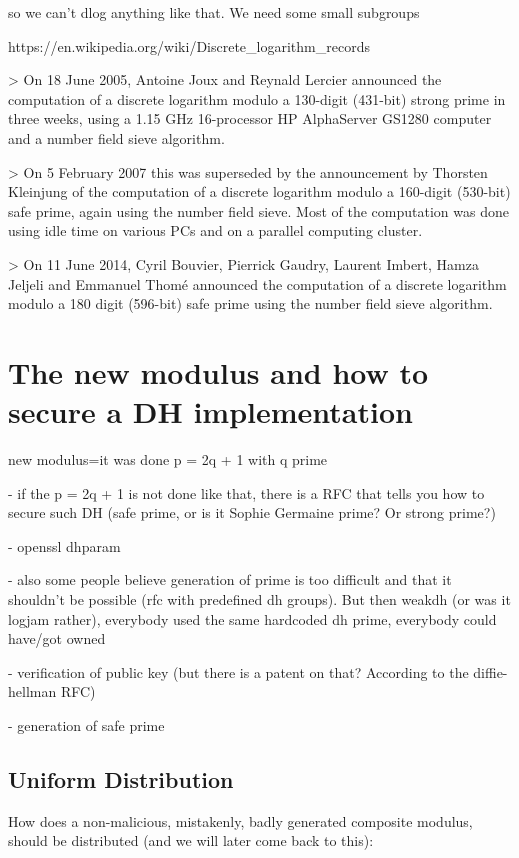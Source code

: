 \documentclass[a4paper,11pt]{article}
\begin{document}
so we can't dlog anything like that. We need some small subgroups

https://en.wikipedia.org/wiki/Discrete_logarithm_records

> On 18 June 2005, Antoine Joux and Reynald Lercier announced the computation of a discrete logarithm modulo a 130-digit (431-bit) strong prime in three weeks, using a 1.15 GHz 16-processor HP AlphaServer GS1280 computer and a number field sieve algorithm.

> On 5 February 2007 this was superseded by the announcement by Thorsten Kleinjung of the computation of a discrete logarithm modulo a 160-digit (530-bit) safe prime, again using the number field sieve. Most of the computation was done using idle time on various PCs and on a parallel computing cluster.

> On 11 June 2014, Cyril Bouvier, Pierrick Gaudry, Laurent Imbert, Hamza Jeljeli and Emmanuel Thomé announced the computation of a discrete logarithm modulo a 180 digit (596-bit) safe prime using the number field sieve algorithm.

\section{The new modulus and how to secure a DH implementation}

new modulus=it was done p = 2q + 1 with q prime


- if the p = 2q + 1 is not done like that, there is a RFC that tells you how to secure such DH (safe prime, or is it Sophie Germaine prime? Or strong prime?)

- openssl dhparam

- also some people believe generation of prime is too difficult and that it shouldn't be possible (rfc with predefined dh groups). But then weakdh (or was it logjam rather), everybody used the same hardcoded dh prime, everybody could have/got owned

- verification of public key (but there is a patent on that? According to the diffie-hellman RFC)

- generation of safe prime

\subsection{Uniform Distribution}

How does a non-malicious, mistakenly, badly generated composite modulus, should be distributed (and we will later come back to this):
\end{document}
